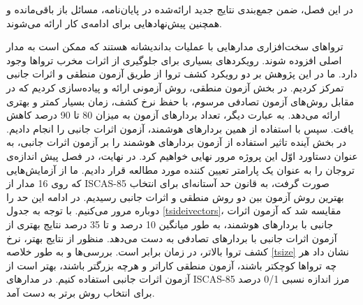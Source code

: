 

در این فصل، ضمن جمع‌بندی نتایج جدید ارائه‌شده در پایان‌نامه، 
مسائل باز باقی‌مانده و همچنین پیش‌نهادهایی برای ادامه‌ی کار ارائه می‌شوند.
 
تروا‌های سخت‌افزاری مدارهایی با عملیات بداندیشانه هستند که ممکن است به مدار اصلی افزوده شوند. رویکردهای بسیاری برای جلوگیری از اثرات مخرب ترواها وجود دارد. ما در این پژوهش بر دو رویکرد کشف تروا از طریق آزمون منطقی و اثرات جانبی تمرکز کردیم. در بخش آزمون منطقی، روش آزمونی ارائه و پیاده‌سازی کردیم که در مقابل روش‌های آزمون تصادفی مرسوم، با حفظ نرخ کشف، زمان بسیار کمتر و بهتری ارائه می‌دهد. به عبارت دیگر، تعداد بردارهای آزمون به میزان 80 تا 90 درصد کاهش یافت. سپس با استفاده از همین بردارهای هوشمند، آزمون اثرات جانبی را انجام دادیم. در بخش آینده تاثیر استفاده از آزمون بردارهای هوشمند را بر آزمون اثرات جانبی، به عنوان دستاورد اوّل این پروژه مرور نهایی خواهیم کرد. در نهایت، در فصل پیش اندازه‌ی تروجان را به عنوان یک پارامتر تعیین کننده مورد مطالعه قرار دادیم. ما از آزمایش‌هایی که روی 16 مدار از ISCAS-85 صورت گرفت، به قانون حد آستانه‌ای برای انتخاب بهترین روش آزمون بین دو روش منطقی و اثرات جانبی رسیدیم. در ادامه این حد را دوباره مرور می‌کنیم.
با توجه به جدول \ref{tsideivectors}، مقایسه شد که آزمون اثرات جانبی با بردارهای هوشمند، به طور میانگین 10 درصد و تا 35 درصد نتایج بهتری از آزمون اثرات جانبی با بردارهای تصادفی به دست می‌دهد. منظور از نتایج بهتر، نرخ کشف تروا بالاتر، در زمان برابر است.
بررسی‌ها و به طور خلاصه \ref{tsize} نشان داد هر چه تروا‌ها کوچکتر باشند، آزمون منطقی کارا‌تر و هرچه بزرگتر باشند، بهتر است از آزمون اثرات جانبی استفاده کنیم. در مدارهای ISCAS-85 مرز اندازه نسبی 0/1 درصد برای انتخاب روش برتر به دست آمد.


